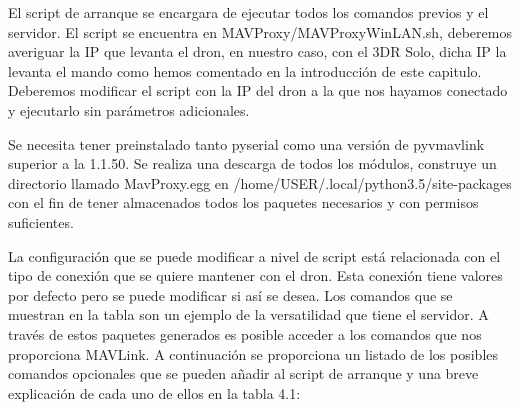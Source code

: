 El script de arranque se encargara de ejecutar todos los comandos previos y el servidor. El script se encuentra en MAVProxy/MAVProxyWinLAN.sh, deberemos averiguar la IP que levanta el dron, en nuestro caso, con el 3DR Solo, dicha IP la levanta el mando como hemos comentado en la introducción de este capitulo. Deberemos modificar el script con la IP del dron a la que nos hayamos conectado y ejecutarlo sin parámetros adicionales. 

Se necesita tener preinstalado tanto pyserial como una versión de pyvmavlink superior a la 1.1.50. Se realiza una descarga de todos los módulos, construye un directorio llamado MavProxy.egg en /home/USER/.local/python3.5/site-packages con el fin de tener almacenados todos los paquetes necesarios y con permisos suficientes. 

La configuración que se puede modificar a nivel de script está relacionada con el tipo de conexión que se quiere mantener con el dron. Esta conexión tiene valores por defecto pero se puede modificar si así se desea. Los comandos que se muestran en la tabla son un ejemplo de la versatilidad que tiene el servidor. A través de estos paquetes generados es posible acceder a los comandos que nos proporciona MAVLink. A continuación se proporciona un listado de los posibles comandos opcionales que se pueden añadir al script de arranque y una breve explicación de cada uno de ellos en la tabla 4.1:

